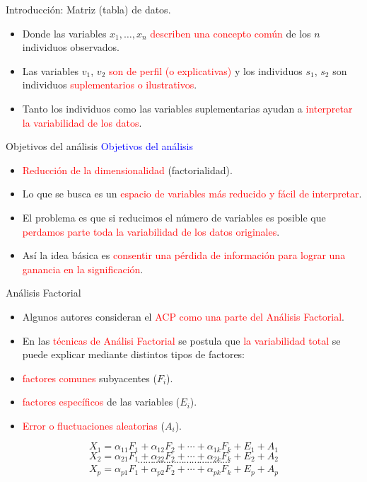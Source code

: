 \documentclass[
  ignorenonframetext,
]{beamer}
\providecommand{\tightlist}{%
  \setlength{\itemsep}{0pt}\setlength{\parskip}{0pt}}
\newcommand\blue[1]{\textcolor{blue}{#1}}
\newcommand\red[1]{\textcolor{red}{#1}}
\begin{document}
\begin{frame}{Introducción: Matriz (tabla) de datos.}
\protect\hypertarget{introducciuxf3n-matriz-tabla-de-datos.-1}{}
\begin{itemize}
\item
  Donde las variables \(x_1,\ldots, x_n\)
  \red{describen una concepto común} de los \(n\) individuos observados.
\item
  Las variables \(v_1\), \(v_2\) \red{son de perfil (o explicativas)} y
  los individuos \(s_1\), \(s_2\) son individuos
  \red{suplementarios o ilustrativos}.
\item
  Tanto los individuos como las variables suplementarias ayudan a
  \red{interpretar la variabilidad de los datos}.
\end{itemize}
\end{frame}

\begin{frame}{Objetivos del análisis}
\protect\hypertarget{objetivos-del-anuxe1lisis}{}
\blue{Objetivos del análisis}

\begin{itemize}
\item
  \red{Reducción de la dimensionalidad} (factorialidad).
\item
  Lo que se busca es un \red{espacio de variables más reducido y fácil
  de interpretar}.
\item
  El problema es que si reducimos el número de variables es posible que
  \red{perdamos parte toda la variabilidad de los datos originales}.
\item
  Así la idea básica es
  \red{consentir una pérdida de información para lograr una
  ganancia en la significación}.
\end{itemize}
\end{frame}

\begin{frame}{Análisis Factorial}
\protect\hypertarget{anuxe1lisis-factorial}{}
\begin{itemize}
\tightlist
\item
  Algunos autores consideran el \red{ACP como una parte del Análisis
  Factorial}.
\item
  En las \red{técnicas de Análisi Factorial} se postula que
  \red{la variabilidad total} se puede explicar mediante distintos tipos
  de factores:
\item
  \red{factores comunes} subyacentes (\(F_i\)).
\item
  \red{factores específicos} de las variables (\(E_i\)).
\item
  \red{Error o fluctuaciones aleatorias} (\(A_i\)).
\end{itemize}

\[X_1=\alpha_{1 1} F_1+ \alpha_{1 2} F_2+\cdots +\alpha_{1 k} F_k+ E_1+ A_1\]
\[X_2=\alpha_{2 1} F_1+ \alpha_{2 2} F_2+\cdots +\alpha_{2 k} F_k+ E_2+ A_2\]
\[\cdots\cdots\cdots\cdots\cdots\cdots\cdots\cdots\cdots\cdots\cdots\cdots\]
\[X_p=\alpha_{p 1} F_1+ \alpha_{p 2} F_2+\cdots +\alpha_{p k} F_k+ E_p+ A_p\]
\end{frame}
\end{document}
